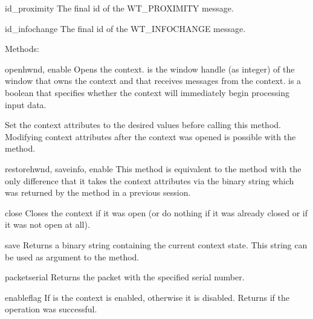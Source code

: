 \begin{memberdesc}{id_proximity}
The final id of the WT_PROXIMITY message.
\end{memberdesc}

\begin{memberdesc}{id_infochange}
The final id of the WT_INFOCHANGE message.
\end{memberdesc}

Methods:

\begin{methoddesc}{open}{hwnd, enable}
Opens the context.  is the window handle (as integer) of the
window that owns the context and that receives messages from the context.
 is a boolean that specifies whether the context will
immediately begin processing input data.

Set the context attributes to the desired values before calling this
method. Modifying context attributes after the context was opened is
possible with the  method.
\end{methoddesc}

\begin{methoddesc}{restore}{hwnd, saveinfo, enable}
This method is equivalent to the  method with the only
difference that it takes the context attributes via the binary
 string which was returned by the  method
in a previous session.
\end{methoddesc}

\begin{methoddesc}{close}{}
Closes the context if it was open (or do nothing if it was already closed
or if it was not open at all).
\end{methoddesc}

\begin{methoddesc}{save}{}
Returns a binary  string containing the current context state.
This string can be used as argument to the  method.
\end{methoddesc}

\begin{methoddesc}{packet}{serial}
Returns the packet with the specified serial number.
\end{methoddesc}

\begin{methoddesc}{enable}{flag}
If  is  the context is enabled, otherwise it is disabled.
Returns  if the operation was successful.
\end{methoddesc}


